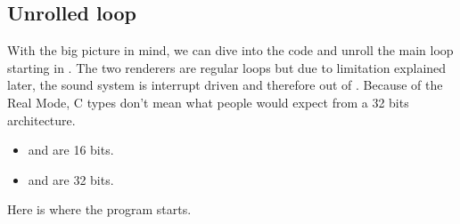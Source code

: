 \documentclass[book.tex]{subfiles}
\begin{document}
\subsection{Unrolled loop}
With the big picture in mind, we can dive into the code and unroll the main loop starting in . The two renderers are regular loops but due to limitation explained later, the sound system is interrupt driven and therefore out of . Because of the Real Mode, C types don't mean what people would expect from a 32 bits architecture.
\begin{itemize}
\item {} and  are 16 bits.
\item {} and  are 32 bits.
\end{itemize}
\par
Here is where the program starts.\\
\par
\begin{minipage}{\textwidth}

\end{minipage}
\par
\end{document}
